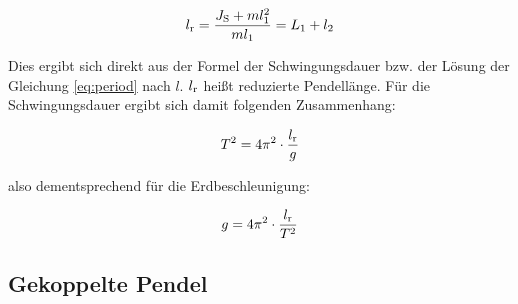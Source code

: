 \begin{equation*}
l_{\mathrm{r}} = \frac{J_{\mathrm{S}}+ml^2_1}{ml_1} = L_1 + l_2
\end{equation*}

Dies ergibt sich direkt aus der Formel der Schwingungsdauer bzw. der Lösung der Gleichung \ref{eq:period} nach $l$. $l_{\mathrm{r}}$ heißt reduzierte Pendellänge. Für die Schwingungsdauer ergibt sich damit folgenden Zusammenhang:

\begin{equation*}
T^2 = 4\pi^2 \cdot \frac{l_{\mathrm{r}}}{g}
\end{equation*}

also dementsprechend für die Erdbeschleunigung:

\begin{equation}
g = 4\pi^2 \cdot \frac{l_{\mathrm{r}}}{T^2}
\label{eq:gravity}
\end{equation}

\subsection{Gekoppelte Pendel}








